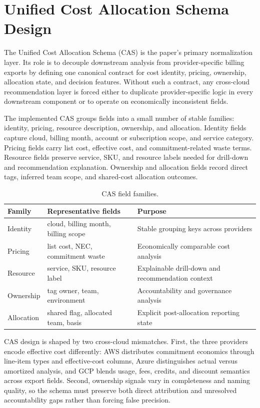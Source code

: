 \section{Unified Cost Allocation Schema Design}
\label{sec:cas}

The Unified Cost Allocation Schema (CAS) is the paper's primary normalization layer. Its role is to decouple downstream analysis from provider-specific billing exports by defining one canonical contract for cost identity, pricing, ownership, allocation state, and decision features. Without such a contract, any cross-cloud recommendation layer is forced either to duplicate provider-specific logic in every downstream component or to operate on economically inconsistent fields.

The implemented CAS groups fields into a small number of stable families: identity, pricing, resource description, ownership, and allocation. Identity fields capture cloud, billing month, account or subscription scope, and service category. Pricing fields carry list cost, effective cost, and commitment-related waste terms. Resource fields preserve service, SKU, and resource labels needed for drill-down and recommendation explanation. Ownership and allocation fields record direct tags, inferred team scope, and shared-cost allocation outcomes.

\begin{table}[t]
\caption{CAS field families.}
\label{tab:cas-families}
\centering
\footnotesize
\begin{tabularx}{\columnwidth}{p{} p{} Y}
\toprule
\textbf{Family} & \textbf{Representative fields} & \textbf{Purpose} \\
\midrule
Identity & cloud, billing month, billing scope & Stable grouping keys across providers \\
Pricing & list cost, NEC, commitment waste & Economically comparable cost analysis \\
Resource & service, SKU, resource label & Explainable drill-down and recommendation context \\
Ownership & tag owner, team, environment & Accountability and governance analysis \\
Allocation & shared flag, allocated team, basis & Explicit post-allocation reporting state \\
\bottomrule
\end{tabularx}
\end{table}

CAS design is shaped by two cross-cloud mismatches. First, the three providers encode effective cost differently: AWS distributes commitment economics through line-item types and effective-cost columns, Azure distinguishes actual versus amortized analysis, and GCP blends usage, fees, credits, and discount semantics across export fields. Second, ownership signals vary in completeness and naming quality, so the schema must preserve both direct attribution and unresolved accountability gaps rather than forcing false precision.

